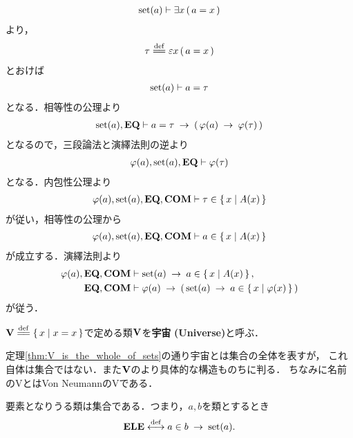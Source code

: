 	\begin{sketch}
		\begin{align}
			\operatorname*{set} (a) \vdash \exists x\, (\, a = x\, )
		\end{align}
		より，
		\begin{align}
			\tau \defeq \varepsilon x\, (\, a = x\, )
		\end{align}
		とおけば
		\begin{align}
			\operatorname*{set} (a) \vdash a = \tau
		\end{align}
		となる．相等性の公理より
		\begin{align}
			\operatorname*{set} (a),\mbox{{\bf EQ}} \vdash 
			a = \tau \hspace{0.25em}\rightarrow\hspace{0.25em} (\, \varphi(a) \hspace{0.25em}\rightarrow\hspace{0.25em} \varphi(\tau)\, )
		\end{align}
		となるので，三段論法と演繹法則の逆より
		\begin{align}
			\varphi(a),\operatorname*{set} (a),\mbox{{\bf EQ}} \vdash \varphi(\tau)
		\end{align}
		となる．内包性公理より
		\begin{align}
			\varphi(a),\operatorname*{set} (a),\mbox{{\bf EQ}},\mbox{\bf COM} \vdash \tau \in \left\{\, x \mid A(x)\, \right\}
		\end{align}
		が従い，相等性の公理から
		\begin{align}
			\varphi(a),\operatorname*{set} (a),\mbox{{\bf EQ}},\mbox{\bf COM} \vdash a \in \left\{\, x \mid A(x)\, \right\}
		\end{align}
		が成立する．演繹法則より
		\begin{align}
			\varphi(a),\mbox{{\bf EQ}},\mbox{\bf COM} &\vdash \operatorname*{set} (a) \hspace{0.25em}\rightarrow\hspace{0.25em} a \in \left\{\, x \mid A(x)\, \right\}, \\
			\mbox{{\bf EQ}},\mbox{\bf COM} &\vdash \varphi(a) \hspace{0.25em}\rightarrow\hspace{0.25em} 
			\left(\, \operatorname*{set} (a) \hspace{0.25em}\rightarrow\hspace{0.25em} a \in \left\{\, x \mid \varphi(x)\, \right\}\, \right)
		\end{align}
		が従う．
		\QED
	\end{sketch}
	
	\begin{screen}
		\begin{dfn}[宇宙]
			$\Univ \defeq \Set{x}{x=x}$で定める類$\mathbf{V}$を{\bf 宇宙}
			{\bf (Universe)}と呼ぶ．
		\end{dfn}
	\end{screen}
	
	定理\ref{thm:V_is_the_whole_of_sets}の通り宇宙とは集合の全体を表すが，
	これ自体は集合ではない．また$\mathbf{V}$のより具体的な構造ものちに判る．
	ちなみに名前のVとはVon NeumannのVである．
	
	\begin{screen}
		\begin{axm}[要素の公理]
			要素となりうる類は集合である．つまり，$a,b$を類とするとき
			\begin{align}
				\mbox{{\bf ELE}} \overset{\mathrm{def}}{\longleftrightarrow} a \in b \hspace{0.25em}\rightarrow\hspace{0.25em} \operatorname*{set} (a).
			\end{align}
		\end{axm}
	\end{screen}
	
